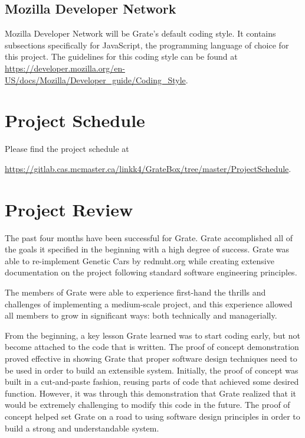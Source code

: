 \documentclass{article}
\begin{document}
\subsection{Mozilla Developer Network}

Mozilla Developer Network will be \textcolor{RoyalPurple}{Grate's} default coding style. It contains 
subsections specifically for JavaScript, the programming language of choice for 
this project.  The guidelines for this coding style can be found at
\url{https://developer.mozilla.org/en-US/docs/Mozilla/Developer\_guide/Coding\_Style}.

\section{Project Schedule}
Please find the project schedule at 

\url{https://gitlab.cas.mcmaster.ca/linkk4/GrateBox/tree/master/ProjectSchedule}.

\section{Project Review}
\textcolor{RoyalPurple}{The past four months have been successful for Grate. Grate 
accomplished all of 
the goals it specified in the beginning with a high degree of success. Grate was 
able to re-implement Genetic Cars by rednuht.org while creating extensive 
documentation on the project following standard software engineering 
principles.}

\textcolor{RoyalPurple}{The members of Grate were able to experience first-hand the 
thrills and 
challenges of implementing a medium-scale project, and this experience allowed 
all members to grow in significant ways: both technically and managerially. }

\textcolor{RoyalPurple}{From the beginning, a key lesson Grate learned was to start 
coding early, but 
not become attached to the code that is written. The proof of concept 
demonstration proved effective in showing Grate that proper software design 
techniques need to be used in order to build an extensible system. Initially, 
the proof of concept was built in a cut-and-paste fashion, reusing parts of code 
that achieved some desired function. However, it was through this demonstration 
that Grate realized that it would be extremely challenging to modify this code 
in the future. The proof of concept helped set Grate on a road to using software 
design principles in order to build a strong and understandable system.}
\end{document}
